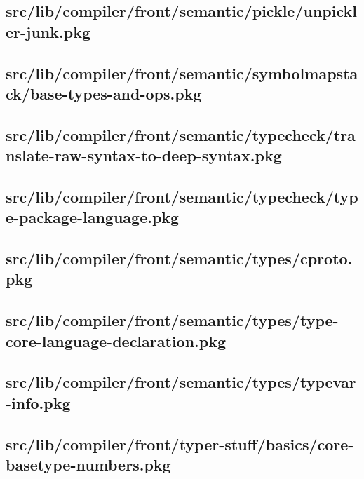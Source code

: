\subsection{src/lib/compiler/front/semantic/pickle/unpickler-junk.pkg}


\subsection{src/lib/compiler/front/semantic/symbolmapstack/base-types-and-ops.pkg}


\subsection{src/lib/compiler/front/semantic/typecheck/translate-raw-syntax-to-deep-syntax.pkg}


\subsection{src/lib/compiler/front/semantic/typecheck/type-package-language.pkg}


\subsection{src/lib/compiler/front/semantic/types/cproto.pkg}


\subsection{src/lib/compiler/front/semantic/types/type-core-language-declaration.pkg}


\subsection{src/lib/compiler/front/semantic/types/typevar-info.pkg}


\subsection{src/lib/compiler/front/typer-stuff/basics/core-basetype-numbers.pkg}


